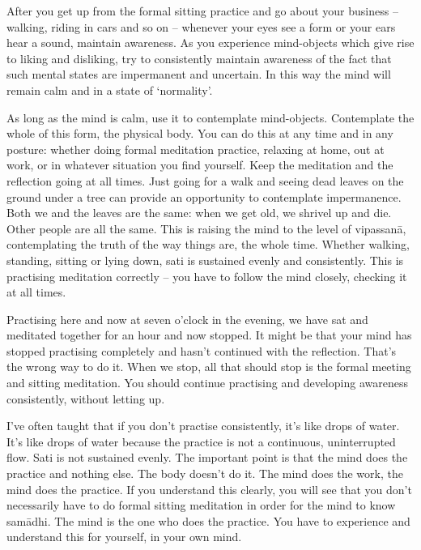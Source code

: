 After you get up from the formal sitting practice and go about your business -- walking, riding in cars and so on -- whenever your eyes see a form or your ears hear a sound, maintain awareness. As you experience mind-objects which give rise to liking and disliking, try to consistently maintain awareness of the fact that such mental states are impermanent and uncertain. In this way the mind will remain calm and in a state of `normality'.

As long as the mind is calm, use it to contemplate mind-objects. Contemplate the whole of this form, the physical body. You can do this at any time and in any posture: whether doing formal meditation practice, relaxing at home, out at work, or in whatever situation you find yourself. Keep the meditation and the reflection going at all times. Just going for a walk and seeing dead leaves on the ground under a tree can provide an opportunity to contemplate impermanence. Both we and the leaves are the same: when we get old, we shrivel up and die. Other people are all the same. This is raising the mind to the level of vipassan\=a, contemplating the truth of the way things are, the whole time. Whether walking, standing, sitting or lying down, sati is sustained evenly and consistently. This is practising meditation correctly -- you have to follow the mind closely, checking it at all times.

Practising here and now at seven o'clock in the evening, we have sat and meditated together for an hour and now stopped. It might be that your mind has stopped practising completely and hasn't continued with the reflection. That's the wrong way to do it. When we stop, all that should stop is the formal meeting and sitting meditation. You should continue practising and developing awareness consistently, without letting up.

I've often taught that if you don't practise consistently, it's like drops of water. It's like drops of water because the practice is not a continuous, uninterrupted flow. Sati is not sustained evenly. The important point is that the mind does the practice and nothing else. The body doesn't do it. The mind does the work, the mind does the practice. If you understand this clearly, you will see that you don't necessarily have to do formal sitting meditation in order for the mind to know sam\=adhi. The mind is the one who does the practice. You have to experience and understand this for yourself, in your own mind.

